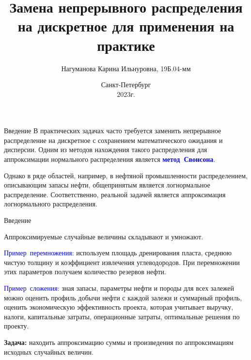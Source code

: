 \documentclass[ucs, notheorems, handout]{beamer}
\title[Замена непрерывного распределения]{Замена непрерывного распределения на дискретное для применения на практике}
\author[Нагуманова~К. И.]{ Нагуманова Карина Ильнуровна, 19Б.04-мм}
\date{\tiny{Санкт-Петербург\\ 2023г.}}
\institute[Санкт-Петербургский Государственный Университет]{%
	\small
	Санкт-Петербургский государственный университет\\
	Прикладная математика и информатика\\
	Вычислительная стохастика и статистические модели\\
	\vspace{1.25cm}}
\begin{document}
	
	\begin{frame}
		\titlepage
	\end{frame}

	\begin{frame}{Введение}
			В практических задачах часто требуется заменить непрерывное распределение на
			дискретное с сохранением математического ожидания и дисперсии. Одним из методов
			нахождения такого распределения для аппроксимации нормального распределения является \textcolor{blue}{\hbox{\textbf{метод Свонсона}}}.
			
			\bigskip
			
			Однако в ряде областей, например, в нефтяной промышленности распределением, описывающим запасы нефти, общепринятым является логнормальное распределение. 
			Соответственно, реальной задачей является аппроксимация логнормального распределения.
	\end{frame}

\begin{frame}{Введение}
	
		Аппроксимируемые случайные величины складывают и умножают.
		
		\bigskip
		
		\textcolor{blue}{\hbox{Пример перемножения:}} используем площадь дренирования пласта, среднюю чистую толщину и коэффициент извлечения углеводородов. При перемножении этих параметров получаем количество резервов нефти.
		
		\bigskip
		
		\textcolor{blue}{\hbox{Пример сложения:}} зная запасы, параметры нефти и породы для всех залежей можно оценить профиль добычи нефти  с каждой залежи и суммарный профиль, оценить экономическую эффективность проекта, которая учитывает выручку, налоги, капитальные затраты, операционные затраты, оптимальные решения по проекту.
		
		\bigskip
		
		\textbf{Задача:} находить аппроксимацию суммы и произведения по аппроксимациям исходных случайных величин.
	
\end{frame}
\end{document}
